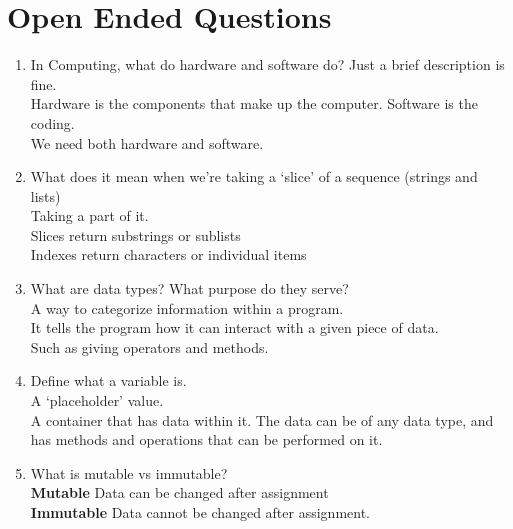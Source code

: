 \documentclass{article}
\begin{document}
    \section*{Open Ended Questions}
    \begin{enumerate}
        \item In Computing, what do hardware and software do? Just a brief description is fine.\\
        Hardware is the components that make up the computer. Software is the coding.\\
        We need both hardware and software.\\
        \item What does it mean when we're taking a `slice' of a sequence (strings and lists)\\
        Taking a part of it.\\
        Slices return substrings or sublists\\
        Indexes return characters or individual items\\
        \item What are data types? What purpose do they serve?\\
        A way to categorize information within a program.\\
        It tells the program how it can interact with a given piece of data.\\
        Such as giving operators and methods.
        \item Define what a variable is.\\
        A `placeholder' value.\\
        A container that has data within it. The data can be of any data type, and has methods and operations that can be performed on it.
        \item What is mutable vs immutable?\\
        \textbf{Mutable} Data can be changed after assignment\\
        \textbf{Immutable} Data cannot be changed after assignment.
    \end{enumerate}
\end{document}
